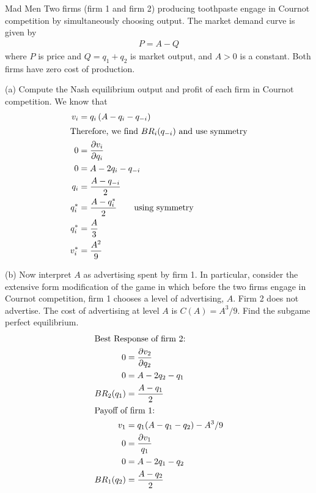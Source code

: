 \documentclass[10pt]{extarticle}
\begin{document}
  \begin{problem}{Mad Men}
    Two firms (firm 1 and firm 2) producing toothpaste engage in Cournot competition by simultaneously choosing output. The market demand curve is given by
    \begin{align*}
      P = A-Q
    \end{align*}
    where $P$ is price and $Q = q_1 + q_2$ is market output, and $A > 0$ is a constant. Both firms have zero cost of production.
    \begin{problem}{(a)}
      Compute the Nash equilibrium output and profit of each firm in Cournot competition.
      \tcblower
      We know that
      \begin{align*}
        v_i &= q_i \left(A-q_i-q_{-i}\right)\\
        \shortintertext{Therefore, we find $BR_{i}(q_{-i})$ and use symmetry}
         0 &= \frac{\partial v_i}{\partial q_i}\\
         0 &= A - 2q_i - q_{-i}\\
         q_i &= \frac{A-q_{-i}}{2}\\
         q_{i}^* &= \frac{A - q_{i}^*}{2}\tag*{using symmetry}\\
         q_{i}^* &= \frac{A}{3}\\
         v_{i}^* &= \frac{A^2}{9}
      \end{align*}
    \end{problem}
    \begin{problem}{(b)}
      Now interpret $A$ as advertising spent by firm 1. In particular, consider the extensive form modification of the game in which before the two firms engage in Cournot competition, firm 1 chooses a level of advertising, $A$. Firm 2 does not advertise. The cost of advertising at level $A$ is $C(A) = A^3/9$. Find the subgame perfect equilibrium.
      \tcblower
      \begin{align*}
        \shortintertext{Best Response of firm 2:}
        0 &= \frac{\partial v_2}{\partial q_2}\\
        0 &= A - 2q_2 - q_1\\
        BR_{2}(q_1) &= \frac{A-q_1}{2}\\
        \shortintertext{Payoff of firm 1:}
        v_1 &= q_1(A - q_1 - q_2) - A^3/9\\
        0 &= \frac{\partial v_1}{q_1}\\
        0 &= A - 2q_1 - q_2\\
        BR_1(q_2) &= \frac{A - q_2}{2}\\

\end{align*}
\end{problem}
\end{problem}
\end{document}
